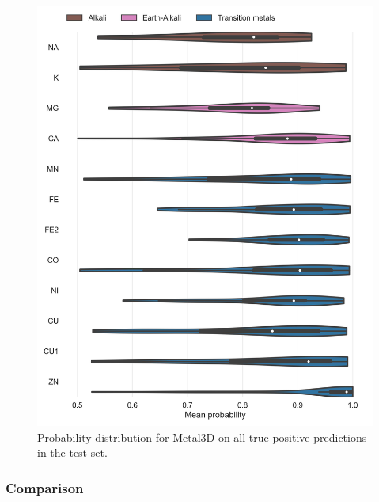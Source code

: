 \documentclass[  ASAPversion,
  ,
  9pt]{elife}
\newenvironment{fignos:tagged-figure}[1][]{
  \let\oldthefigure\thefigure
  \let\oldtheHfigure\theHfigure
  \renewcommand{\thefigure}{#1}
  \renewcommand{\theHfigure}{#1}
}{
  \let\thefigure\oldthefigure
  \let\theHfigure\oldtheHfigure
  \addtocounter{figure}{-1}
}
\begin{document}
\begin{fignos:tagged-figure}[S6]

\begin{figure}
\hypertarget{fig:selectivity-probability-metal3d}{%
\centering
\includegraphics{images/probability_violin.jpg}
\caption{Probability distribution for Metal3D on all true positive predictions in the test set.}\label{fig:selectivity-probability-metal3d}
}
\end{figure}

\end{fignos:tagged-figure}

\hypertarget{comparison-1}{%
\subsubsection{Comparison}\label{comparison-1}}
\end{document}
